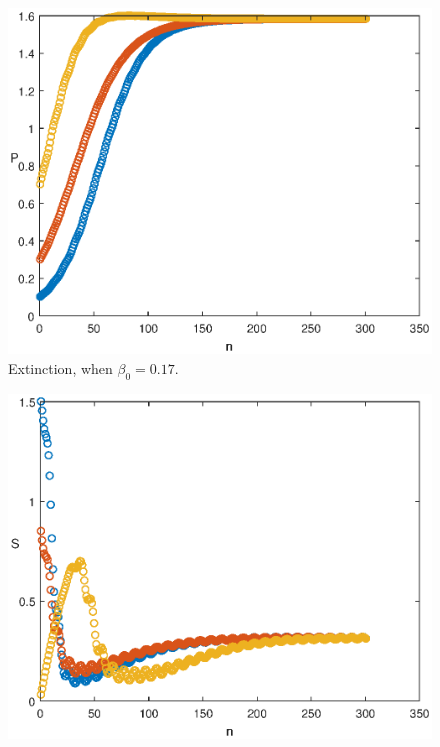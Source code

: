 \documentclass[reqno]{amsart}
\begin{document}
{{\begin{figure}
\begin{minipage}[b]{.32\linewidth}
  \end{minipage}
  \begin{minipage}[b]{.32\linewidth}
        \includegraphics[width=\linewidth]{Predator_EXT_PER.eps}
  \end{minipage}
    \caption{Extinction, when $\beta_0=0.17$.}
      \label{fig-no-periodic-PER-1}
\end{figure}
\begin{figure}
  \begin{minipage}[b]{.32\linewidth}
    \includegraphics[width=\linewidth]{Susceptible_PERS_PER.eps}

\end{minipage}
\end{figure}}}
\end{document}
